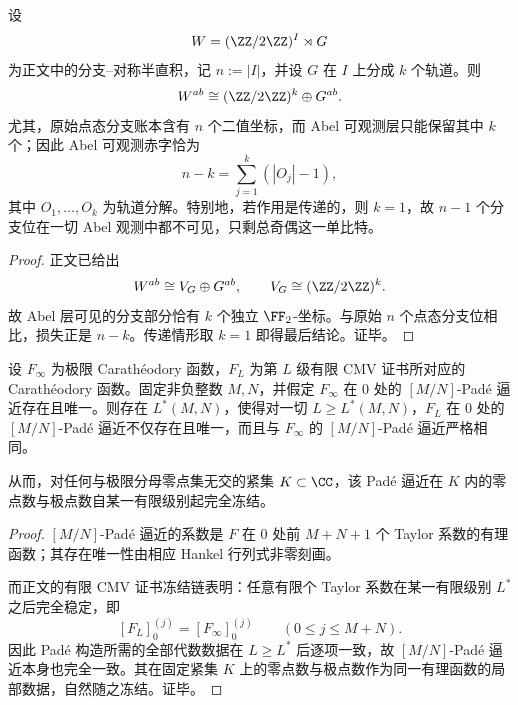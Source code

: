\begin{theorem}\label{thm:conclusion-branch-ledger-abelian-observable-deficit}
设
\[
W=(\ZZ/2\ZZ)^I\rtimes G
\]
为正文中的分支--对称半直积，记 \(n:=|I|\)，并设 \(G\) 在 \(I\) 上分成 \(k\) 个轨道。则
\[
W^{ab}\cong (\ZZ/2\ZZ)^k\oplus G^{ab}.
\]
尤其，原始点态分支账本含有 \(n\) 个二值坐标，而 Abel 可观测层只能保留其中 \(k\) 个；因此 Abel 可观测赤字恰为
\[
n-k=\sum_{j=1}^{k}(|O_j|-1),
\]
其中 \(O_1,\dots,O_k\) 为轨道分解。特别地，若作用是传递的，则 \(k=1\)，故 \(n-1\) 个分支位在一切 Abel 观测中都不可见，只剩总奇偶这一单比特。
\end{theorem}
\begin{proof}
正文已给出
\[
W^{ab}\cong V_G\oplus G^{ab},
\qquad
V_G\cong (\ZZ/2\ZZ)^k.
\]
故 Abel 层可见的分支部分恰有 \(k\) 个独立 \(\FF_2\)-坐标。与原始 \(n\) 个点态分支位相比，损失正是 \(n-k\)。传递情形取 \(k=1\) 即得最后结论。证毕。
\end{proof}

\begin{theorem}\label{thm:conclusion-finite-cmv-certificate-pade-hardy-freezing}
设 \(F_\infty\) 为极限 Carath\'eodory 函数，\(F_L\) 为第 \(L\) 级有限 CMV 证书所对应的 Carath\'eodory 函数。固定非负整数 \(M,N\)，并假定 \(F_\infty\) 在 \(0\) 处的 \([M/N]\)-Pad\'e 逼近存在且唯一。则存在 \(L^\ast(M,N)\)，使得对一切 \(L\ge L^\ast(M,N)\)，\(F_L\) 在 \(0\) 处的 \([M/N]\)-Pad\'e 逼近不仅存在且唯一，而且与 \(F_\infty\) 的 \([M/N]\)-Pad\'e 逼近严格相同。

从而，对任何与极限分母零点集无交的紧集 \(K\subset\CC\)，该 Pad\'e 逼近在 \(K\) 内的零点数与极点数自某一有限级别起完全冻结。
\end{theorem}
\begin{proof}
\([M/N]\)-Pad\'e 逼近的系数是 \(F\) 在 \(0\) 处前 \(M+N+1\) 个 Taylor 系数的有理函数；其存在唯一性由相应 Hankel 行列式非零刻画。

而正文的有限 CMV 证书冻结链表明：任意有限个 Taylor 系数在某一有限级别 \(L^\ast\) 之后完全稳定，即
\[
[F_L]_{0}^{(j)}=[F_\infty]_{0}^{(j)}
\qquad (0\le j\le M+N).
\]
因此 Pad\'e 构造所需的全部代数数据在 \(L\ge L^\ast\) 后逐项一致，故 \([M/N]\)-Pad\'e 逼近本身也完全一致。其在固定紧集 \(K\) 上的零点数与极点数作为同一有理函数的局部数据，自然随之冻结。证毕。
\end{proof}

